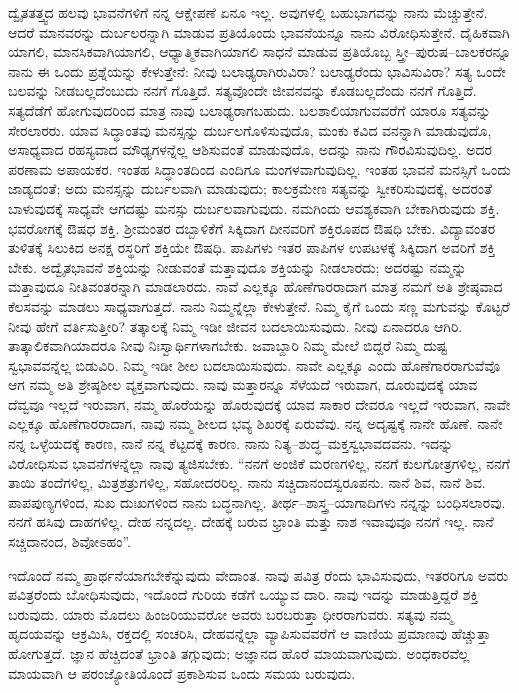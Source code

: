 ದ್ವೈತತತ್ತ್ವದ ಹಲವು ಭಾವನೆಗಳಿಗೆ ನನ್ನ ಆಕ್ಷೇಪಣೆ ಏನೂ ಇಲ್ಲ. ಅವುಗಳಲ್ಲಿ ಬಹುಭಾಗವನ್ನು ನಾನು ಮೆಚ್ಚುತ್ತೇನೆ. ಆದರೆ ಮಾನವರನ್ನು ದುರ್ಬಲರನ್ನಾಗಿ ಮಾಡುವ ಪ್ರತಿಯೊಂದು ಭಾವನೆಯನ್ನೂ ನಾನು ವಿರೋಧಿಸುತ್ತೇನೆ. ದೈಹಿಕವಾಗಿ ಯಾಗಲಿ, ಮಾನಸಿಕವಾಗಿಯಾಗಲಿ, ಆಧ್ಯಾತ್ಮಿಕವಾಗಿಯಾಗಲಿ ಸಾಧನೆ ಮಾಡುವ ಪ್ರತಿಯೊಬ್ಬ ಸ್ತ್ರೀ–ಪುರುಷ–ಬಾಲಕರನ್ನೂ ನಾನು ಈ ಒಂದು ಪ್ರಶ್ನೆಯನ್ನು ಕೇಳುತ್ತೇನೆ: ನೀವು ಬಲಾಢ್ಯರಾಗಿರುವಿರಾ? ಬಲಾಢ್ಯರೆಂದು ಭಾವಿಸುವಿರಾ? ಸತ್ಯ ಒಂದೇ ಬಲವನ್ನು ನೀಡಬಲ್ಲದೆಂಬುದು ನನಗೆ ಗೊತ್ತಿದೆ. ಸತ್ಯವೊಂದೇ ಜೀವನವನ್ನು ಕೊಡಬಲ್ಲದೆಂದು ನನಗೆ ಗೊತ್ತಿದೆ. ಸತ್ಯದೆಡೆಗೆ ಹೋಗುವುದರಿಂದ ಮಾತ್ರ ನಾವು ಬಲಾಢ್ಯರಾಗಬಹುದು. ಬಲಶಾಲಿಯಾಗುವವರೆಗೆ ಯಾರೂ ಸತ್ಯವನ್ನು ಸೇರಲಾರರು. ಯಾವ ಸಿದ್ಧಾಂತವು ಮನಸ್ಸನ್ನು ದುರ್ಬಲಗೊಳಿಸುವುದೊ, ಮಂಕು ಕವಿದ ವನನ್ನಾಗಿ ಮಾಡುವುದೊ, ಅಸಾಧ್ಯವಾದ ರಹಸ್ಯವಾದ ಮೌಢ್ಯಗಳನ್ನೆಲ್ಲ ಆಶಿಸುವಂತೆ ಮಾಡುವುದೊ, ಅದನ್ನು ನಾನು ಗೌರವಿಸುವುದಿಲ್ಲ. ಅದರ ಪರಣಾಮ ಅಪಾಯಕರ. ಇಂತಹ ಸಿದ್ಧಾಂತದಿಂದ ಎಂದಿಗೂ ಮಂಗಳವಾಗುವುದಿಲ್ಲ. ಇಂತಹ ಭಾವನೆ ಮನಸ್ಸಿಗೆ ಒಂದು ಜಾಡ್ಯದಂತೆ; ಅದು ಮನಸ್ಸನ್ನು ದುರ್ಬಲವಾಗಿ ಮಾಡುವುದು; ಕಾಲಕ್ರಮೇಣ ಸತ್ಯವನ್ನು ಸ್ವೀಕರಿಸುವುದಕ್ಕೆ, ಅದರಂತೆ ಬಾಳುವುದಕ್ಕೆ ಸಾಧ್ಯವೇ ಆಗದಷ್ಟು ಮನಸ್ಸು ದುರ್ಬಲವಾಗುವುದು. ನಮಗಿಂದು ಆವಶ್ಯಕವಾಗಿ ಬೇಕಾಗಿರುವುದು ಶಕ್ತಿ. ಭವರೋಗಕ್ಕೆ ಔಷಧ ಶಕ್ತಿ. ಶ‍್ರೀಮಂತರ ದಬ್ಬಾಳಿಕೆಗೆ ಸಿಕ್ಕಿದಾಗ ದೀನವರಿಗೆ ಶಕ್ತಿರೂಪದ ಔಷಧಿ ಬೇಕು. ವಿದ್ಯಾವಂತರ ತುಳಿತಕ್ಕೆ ಸಿಲುಕಿದ ಅನಕ್ಷ ರಸ್ಥರಿಗೆ ಶಕ್ತಿಯೇ ಔಷಧಿ. ಪಾಪಿಗಳು ಇತರ ಪಾಪಿಗಳ ಉಪಟಳಕ್ಕೆ ಸಿಕ್ಕಿದಾಗ ಅವರಿಗೆ ಶಕ್ತಿ ಬೇಕು. ಅದ್ವೈತಭಾವನೆ ಶಕ್ತಿಯನ್ನು ನೀಡುವಂತೆ ಮತ್ತಾವುದೂ ಶಕ್ತಿಯನ್ನು ನೀಡಲಾರದು; ಅದರಷ್ಟು ನಮ್ಮನ್ನು ಮತ್ತಾವುದೂ ನೀತಿವಂತರನ್ನಾಗಿ ಮಾಡಲಾರದು. ನಾವೆ ಎಲ್ಲಕ್ಕೂ ಹೊಣೆಗಾರರಾದಾಗ ಮಾತ್ರ ನಮಗೆ ಅತಿ ಶ್ರೇಷ್ಠವಾದ ಕೆಲಸವನ್ನು ಮಾಡಲು ಸಾಧ್ಯವಾಗುತ್ತದೆ. ನಾನು ನಿಮ್ಮನ್ನೆಲ್ಲಾ ಕೇಳುತ್ತೇನೆ. ನಿಮ್ಮ ಕೈಗೆ ಒಂದು ಸಣ್ಣ ಮಗುವನ್ನು ಕೊಟ್ಟರೆ ನೀವು ಹೇಗೆ ವರ್ತಿಸುತ್ತೀರಿ? ತತ್ಕಾಲಕ್ಕೆ ನಿಮ್ಮ ಇಡೀ ಜೀವನ ಬದಲಾಯಿಸುವುದು. ನೀವು ಏನಾದರೂ ಆಗಿರಿ. ತಾತ್ಕಾಲಿಕವಾಗಿಯಾದರೂ ನೀವು ನಿಃಸ್ವಾರ್ಥಿಗಳಾಗಬೇಕು. ಜವಾಬ್ದಾರಿ ನಿಮ್ಮ ಮೇಲೆ ಬಿದ್ದರೆ ನಿಮ್ಮ ದುಷ್ಟ ಸ್ವಭಾವವನ್ನೆಲ್ಲ ಬಿಡುವಿರಿ. ನಿಮ್ಮ ಇಡೀ ಶೀಲ ಬದಲಾಯಿಸುವುದು. ನಾವೇ ಎಲ್ಲಕ್ಕೂ ಎಂದು ಹೊಣೆಗಾರರಾಗುವೆವೊ ಆಗ ನಮ್ಮ ಅತಿ ಶ್ರೇಷ್ಠಶೀಲ ವ್ಯಕ್ತವಾಗುವುದು. ನಾವು ಮತ್ತಾರನ್ನೂ ಸೆಳೆಯದೆ ಇರುವಾಗ, ದೂರುವುದಕ್ಕೆ ಯಾವ ದೆವ್ವವೂ ಇಲ್ಲದೆ ಇರುವಾಗ, ನಮ್ಮ ಹೊರೆಯನ್ನು ಹೊರುವುದಕ್ಕೆ ಯಾವ ಸಾಕಾರ ದೇವರೂ ಇಲ್ಲದೆ ಇರುವಾಗ, ನಾವೇ ಎಲ್ಲಕ್ಕೂ ಹೊಣೆಗಾರರಾದಾಗ, ನಾವು ನಮ್ಮ ಶೀಲದ ಭವ್ಯ ಶಿಖರಕ್ಕೆ ಏರುವೆವು. ನನ್ನ ಅದೃಷ್ಟಕ್ಕೆ ನಾನೇ ಹೊಣೆ. ನಾನೇ ನನ್ನ ಒಳ್ಳೆಯದಕ್ಕೆ ಕಾರಣ, ನಾನೆ ನನ್ನ ಕೆಟ್ಟದಕ್ಕೆ ಕಾರಣ. ನಾನು ನಿತ್ಯ–ಶುದ್ಧ–ಮಕ್ತಸ್ವಭಾವದವನು. ಇದನ್ನು ವಿರೋಧಿಸುವ ಭಾವನೆಗಳನ್ನೆಲ್ಲಾ ನಾವು ತ್ಯಜಿಸಬೇಕು. “ನನಗೆ ಅಂಜಿಕೆ ಮರಣಗಳಿಲ್ಲ, ನನಗೆ ಕುಲಗೋತ್ರಗಳಿಲ್ಲ, ನನಗೆ ತಾಯಿ ತಂದೆಗಳಿಲ್ಲ, ಮಿತ್ರಶತ್ರುಗಳಿಲ್ಲ, ಸಹೋದರರಿಲ್ಲ. ನಾನು ಸಚ್ಚಿದಾನಂದಸ್ವರೂಪನು. ನಾನೆ ಶಿವ, ನಾನೆ ಶಿವ. ಪಾಪಪುಣ್ಯಗಳಿಂದ, ಸುಖ ದುಃಖಗಳಿಂದ ನಾನು ಬದ್ಧನಾಗಿಲ್ಲ. ತೀರ್ಥ–ಶಾಸ್ತ್ರ–ಯಾಗಾದಿಗಳು ನನ್ನನ್ನು ಬಂಧಿಸಲಾರವು. ನನಗೆ ಹಸಿವು ದಾಹಗಳಿಲ್ಲ. ದೇಹ ನನ್ನದಲ್ಲ. ದೇಹಕ್ಕೆ ಬರುವ ಭ್ರಾಂತಿ ಮತ್ತು ನಾಶ ಇವಾವುವೂ ನನಗೆ ಇಲ್ಲ. ನಾನೆ ಸಚ್ಚಿದಾನಂದ, ಶಿವೋಽಹಂ”.

ಇದೊಂದೆ ನಮ್ಮ ಪ್ರಾರ್ಥನೆಯಾಗಬೇಕೆನ್ನುವುದು ವೇದಾಂತ. ನಾವು ಪವಿತ್ರ ರೆಂದು ಭಾವಿಸುವುದು, ಇತರರಿಗೂ ಅವರು ಪವಿತ್ರರೆಂದು ಬೋಧಿಸುವುದು, ಇದೊಂದೆ ಗುರಿಯ ಕಡೆಗೆ ಒಯ್ಯುವ ದಾರಿ. ನಾವು ಇದನ್ನು ಮಾಡುತ್ತಿದ್ದರೆ ಶಕ್ತಿ ಬರುವುದು. ಯಾರು ಮೊದಲು ಹಿಂಜರಿಯುವರೋ ಅವರು ಬರಬರುತ್ತಾ ಧೀರರಾಗುವರು. ಸತ್ಯವು ನಮ್ಮ ಹೃದಯವನ್ನು ಆಕ್ರಮಿಸಿ, ರಕ್ತದಲ್ಲಿ ಸಂಚರಿಸಿ, ದೇಹವನ್ನೆಲ್ಲಾ ವ್ಯಾಪಿಸುವವರೆಗೆ ಆ ವಾಣಿಯ ಪ್ರಮಾಣವು ಹೆಚ್ಚುತ್ತಾ ಹೋಗುತ್ತದೆ. ಜ್ಞಾನ ಹೆಚ್ಚಿದಂತೆ ಭ್ರಾಂತಿ ತಗ್ಗುವುದು; ಅಜ್ಞಾನದ ಹೊರೆ ಮಾಯವಾಗುವುದು. ಅಂಧಕಾರವೆಲ್ಲ ಮಾಯವಾಗಿ ಆ ಪರಂಜ್ಯೋತಿಯೊಂದೆ ಪ್ರಕಾಶಿಸುವ ಒಂದು ಸಮಯ ಬರುವುದು.

